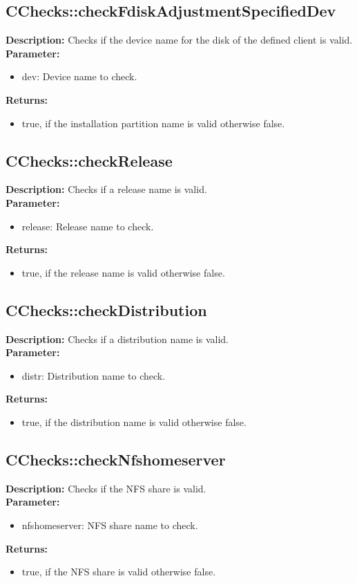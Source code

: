 \subsection{CChecks::checkFdiskAdjustmentSpecifiedDev}
\textbf{Description:} Checks if the device name for the disk of the defined client is valid.\\
\textbf{Parameter:}
\begin{itemize}
\item dev: Device name to check.
\end{itemize}
\textbf{Returns:}
\begin{itemize}
\item true, if the installation partition name is valid otherwise false.
\end{itemize}

\subsection{CChecks::checkRelease}
\textbf{Description:} Checks if a release name is valid.\\
\textbf{Parameter:}
\begin{itemize}
\item release: Release name to check.
\end{itemize}
\textbf{Returns:}
\begin{itemize}
\item true, if the release name is valid otherwise false.
\end{itemize}

\subsection{CChecks::checkDistribution}
\textbf{Description:} Checks if a distribution name is valid.\\
\textbf{Parameter:}
\begin{itemize}
\item distr: Distribution name to check.
\end{itemize}
\textbf{Returns:}
\begin{itemize}
\item true, if the distribution name is valid otherwise false.
\end{itemize}

\subsection{CChecks::checkNfshomeserver}
\textbf{Description:} Checks if the NFS share is valid.\\
\textbf{Parameter:}
\begin{itemize}
\item nfshomeserver: NFS share name to check.
\end{itemize}
\textbf{Returns:}
\begin{itemize}
\item true, if the NFS share is valid otherwise false.
\end{itemize}

